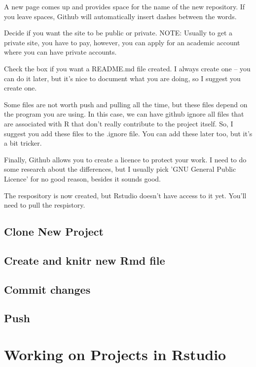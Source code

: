 \documentclass[12pt]{../SOP3_beta}
\begin{document}
\NP A new page comes up and provides space for the name of the new repository. If you leave spaces, Github will automatically insert dashes between the words.

\NP Decide if you want the site to be public or private. NOTE: Usually to get a private site, you have to pay, however, you can apply for an academic account where you can have private accounts. 

\NP Check the box if you want a README.md file created. I always create one -- you can do it later, but it's nice to document what you are doing, so I suggest you create one.

\NP Some files are not worth push and pulling all the time, but these files depend on the program you are using. In this case, we can have github ignore all files that are associated with R that don't really contribute to the project itself. So, I suggest you add these files to the .ignore file. You can add these later too, but it's a bit tricker.

\NP Finally, Github allows you to create a licence to protect your work. I need to do some research about the differences, but I usually pick 'GNU General Public Licence' for no good reason, besides it sounds good.

\NP The respository is now created, but Rstudio doesn't have access to it yet. You'll need to pull the respistory.

\subsection{Clone New Project}

\subsection{Create and knitr new Rmd file}

\subsection{Commit changes}

\subsection{Push}

\section{Working on Projects in Rstudio}
\end{document}
